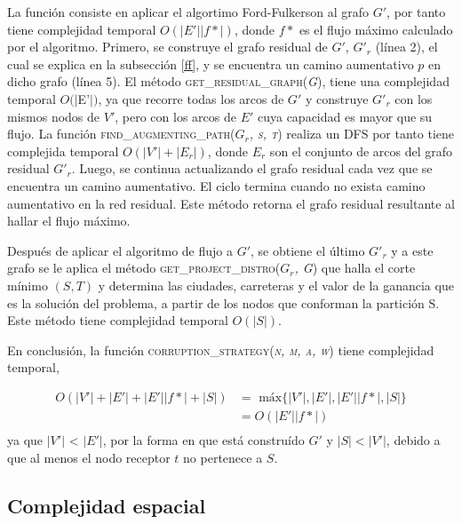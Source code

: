 \documentclass[10pt]{article} %
\begin{document}
	La funci\'on consiste en aplicar el algortimo Ford-Fulkerson al grafo $G'$, por tanto tiene complejidad temporal $O(|E'||f*|)$, donde $f*$ es el flujo m\'aximo calculado por el algoritmo. Primero, se construye el grafo residual de $G'$,  $G'_r$ (l\'inea 2), el cual se explica en la subsecci\'on \ref{ff}, y se encuentra un camino aumentativo $p$ en dicho grafo (l\'inea 5). El m\'etodo \textsc{get\_residual\_graph(\textit{G})}, tiene una complejidad temporal $O(|$E'$|)$, ya que recorre todas los arcos de $G'$ y construye $G'_r$ con los mismos nodos de $V'$, pero con los arcos de $E'$ cuya capacidad es mayor que su flujo. La funci\'on \textsc{find\_augmenting\_path(\textit{$G_r$, s, t})} realiza un DFS por tanto tiene complejida temporal $O(|V'| + |E_r|)$, donde $E_r$ son el conjunto de arcos del grafo residual $G'_r$. Luego, se continua actualizando el grafo residual cada vez que se encuentra un camino aumentativo. El ciclo termina cuando no exista camino aumentativo en la red residual. Este m\'etodo retorna el grafo residual resultante al hallar el flujo m\'aximo.
	
	Despu\'es de aplicar el algoritmo de flujo a $G'$, se obtiene el \'ultimo $G'_r$ y a este grafo se le aplica el m\'etodo \textsc{get\_project\_distro(\textit{$G_r$, G})} que halla el corte m\'inimo $(S,T)$ y determina las ciudades, carreteras y el valor de la ganancia que es la soluci\'on del problema, a partir de los nodos que conforman la partici\'on S. Este m\'etodo tiene complejidad temporal $O(|S|)$.
	
	En conclusi\'on, la funci\'on \textsc{corruption\_strategy(\textit{n, m, a, w})} tiene complejidad temporal,
	
	\begin{equation}
		\begin{aligned}
			O(|V'| + |E'| + |E'||f*| + |S|) &=\text{ m\'ax}\{|V'|, |E'|, |E'||f*|, |S|\}\\
			&=O(|E'||f*|)\\
		\end{aligned}		
	\end{equation}
	ya que $|V'|$ < $|E'|$, por la forma en que est\'a constru\'ido $G'$ y $|S|<|V'|$, debido a que al menos el nodo receptor $t$ no pertenece a $S$.

	

	\subsection{Complejidad espacial}
	
\end{document}
